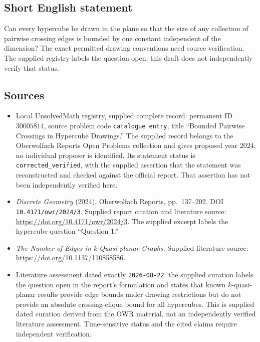 \documentclass[11pt]{article}
\begin{document}
\subsection{Short English statement}
Can every hypercube be drawn in the plane so that the size of any collection of pairwise crossing edges is bounded by one constant independent of the dimension? The exact permitted drawing conventions need source verification. The supplied registry labels the question open; this draft does not independently verify that status.
\subsection{Sources}
\begin{itemize}
\item Local UnsolvedMath registry, supplied complete record: permanent ID \(30005814\), source problem code \texttt{catalogue entry}, title ``Bounded Pairwise Crossings in Hypercube Drawings.'' The supplied record belongs to the Oberwolfach Reports Open Problems collection and gives proposed year 2024; no individual proposer is identified. Its statement status is \texttt{corrected\_verified}, with the supplied assertion that the statement was reconstructed and checked against the official report. That assertion has not been independently verified here.
\item \emph{Discrete Geometry} (2024), Oberwolfach Reports, pp.\ 137--202, DOI \texttt{10.4171/owr/2024/3}. Supplied report citation and literature source: \url{https://doi.org/10.4171/owr/2024/3}. The supplied excerpt labels the hypercube question ``Question 1.''
\item \emph{The Number of Edges in k-Quasi-planar Graphs}. Supplied literature source: \url{https://doi.org/10.1137/110858586}.
\item Literature assessment dated exactly \texttt{2026-08-22}: the supplied curation labels the question open in the report's formulation and states that known \(k\)-quasi-planar results provide edge bounds under drawing restrictions but do not provide an absolute crossing-clique bound for all hypercubes. This is supplied dated curation derived from the OWR material, not an independently verified literature assessment. Time-sensitive status and the cited claims require independent verification.
\end{itemize}
\end{document}
